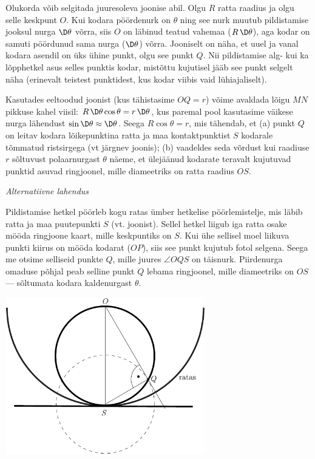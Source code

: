 \documentclass[11pt]{article}
\begin{document}
{{Olukorda võib selgitada juuresoleva joonise abil.
Olgu $R$ ratta raadius ja olgu selle keskpunt $O$. Kui kodara pöördenurk on $\theta$ ning see nurk muutub pildistamise jooksul nurga $\D\theta$ võrra,
siis $O$ on läbinud teatud vahemaa ($R \, \D\theta$), aga kodar on samuti pöördunud sama nurga ($\D \theta$) võrra.
Jooniselt on näha, et uuel ja vanal kodara asendil on üks ühine punkt, olgu see punkt $Q$. Nii pildistamise alg- kui ka lõpphetkel asus selles punktis kodar, mistõttu kujutisel jääb see punkt selgelt näha (erinevalt teistest punktidest, kus kodar viibis vaid lühiajaliselt).

Kasutades eeltoodud joonist (kus tähistasime $OQ = r$) võime avaldada lõigu $MN$
pikkuse kahel viisil: $R \,\D \theta \cos \theta = r \,\D \theta$, kus
paremal pool kasutasime väikese nurga lähendust $\sin \D\theta\approx \D\theta$. Seega $R \cos \theta = r$, mis tähendab, et
(a) punkt $Q$ on leitav kodara lõikepunktina ratta ja maa kontaktpunktist $S$ kodarale tõmmatud ristsirgega (vt järgnev joonis);
(b) vaadeldes seda võrdust kui raadiuse $r$ sõltuvust polaarnurgast $\theta$ näeme, et ülejäänud kodarate teravalt kujutuvad punktid asuvad ringjoonel,
mille diameetriks on ratta raadius $OS$.

\vspace{0.5\baselineskip}

\textit{Alternatiivne lahendus}

Pildistamise hetkel pöörleb kogu ratas ümber hetkelise pöörlemistelje, mis läbib
ratta ja maa puutepunkti $S$ (vt. joonist). Sellel hetkel liigub iga ratta osake
mööda ringjoone kaart, mille keskpuntiks on $S$. Kui ühe sellisel moel liikuva
punkti kiirus on mööda kodarat ($OP$), siis see punkt kujutub fotol selgena.
Seega me otsime selliseid punkte $Q$, mille juures $\angle OQS$ on täisnurk.
Piirdenurga omaduse põhjal peab selline punkt $Q$ lebama ringjoonel, mille
diameetriks on $OS$ --- sõltumata kodara kaldenurgast $\theta$.
\begin{center}
	\includegraphics[width=0.65\textwidth]{2011-lahg-10-kodar_b}
\end{center}
\fi
}

}
\end{document}
